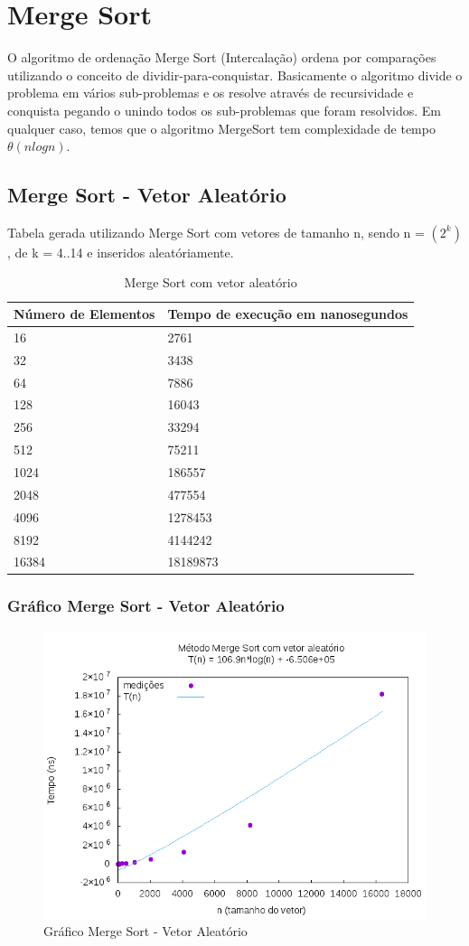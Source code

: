 \documentclass[12pt,a4paper,twoside]{report}
\begin{document}
\chapter{Merge Sort}
O algoritmo de ordenação Merge Sort (Intercalação) ordena por comparações utilizando o conceito de dividir-para-conquistar.
Basicamente o algoritmo divide o problema em vários sub-problemas e os resolve através de recursividade e conquista pegando o unindo todos os sub-problemas que foram resolvidos.
Em qualquer caso, temos que o algoritmo MergeSort tem complexidade de tempo $\theta(nlogn)$.

\section{Merge Sort - Vetor Aleatório}
Tabela gerada utilizando Merge Sort com vetores de tamanho n, sendo n = $(2^k)$, de k = 4..14 e inseridos aleatóriamente.
\begin{table}[H]
\centering
\caption{Merge Sort com vetor aleatório}
\label{my-label}
\begin{tabular}{|l|l|}
\hline
\multicolumn{1}{|c|}{\textbf{Número de Elementos}} & \multicolumn{1}{c|}{\textbf{Tempo de execução em nanosegundos}} \\ \hline
16 & 2761 \\ \hline
32 & 3438 \\ \hline
64 & 7886 \\ \hline
128 & 16043 \\ \hline
256 & 33294 \\ \hline
512 & 75211 \\ \hline
1024 & 186557 \\ \hline
2048 & 477554 \\ \hline
4096 & 1278453 \\ \hline
8192 & 4144242 \\ \hline
16384 & 18189873 \\ \hline
\end{tabular}
\end{table}

\subsection{Gráfico Merge Sort - Vetor Aleatório}
\begin{figure}[H]
    \centering
    \includegraphics[width=0.7\linewidth]{graficos/MergeSort/vIntAleatorio/vIntAleatorio.png}
  \caption{Gráfico Merge Sort - Vetor Aleatório}
\end{figure}
\end{document}
